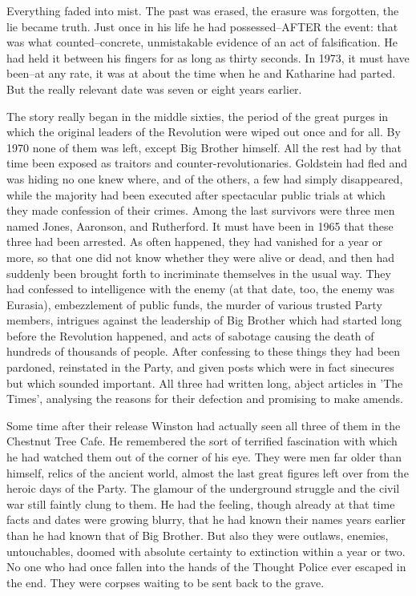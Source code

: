 \documentclass{article}
\begin{document}
Everything faded into mist. The past was erased, the erasure was forgotten,
the lie became truth. Just once in his life he had possessed--AFTER the
event: that was what counted--concrete, unmistakable evidence of an act of
falsification. He had held it between his fingers for as long as thirty
seconds. In 1973, it must have been--at any rate, it was at about the time
when he and Katharine had parted. But the really relevant date was seven
or eight years earlier.

The story really began in the middle sixties, the period of the great
purges in which the original leaders of the Revolution were wiped out
once and for all. By 1970 none of them was left, except Big Brother
himself. All the rest had by that time been exposed as traitors and
counter-revolutionaries. Goldstein had fled and was hiding no one knew
where, and of the others, a few had simply disappeared, while the majority
had been executed after spectacular public trials at which they made
confession of their crimes. Among the last survivors were three men named
Jones, Aaronson, and Rutherford. It must have been in 1965 that these three
had been arrested. As often happened, they had vanished for a year or more,
so that one did not know whether they were alive or dead, and then had
suddenly been brought forth to incriminate themselves in the usual way.
They had confessed to intelligence with the enemy (at that date, too, the
enemy was Eurasia), embezzlement of public funds, the murder of various
trusted Party members, intrigues against the leadership of Big Brother
which had started long before the Revolution happened, and acts of sabotage
causing the death of hundreds of thousands of people. After confessing to
these things they had been pardoned, reinstated in the Party, and given
posts which were in fact sinecures but which sounded important. All three
had written long, abject articles in 'The Times', analysing the reasons
for their defection and promising to make amends.

Some time after their release Winston had actually seen all three of them
in the Chestnut Tree Cafe. He remembered the sort of terrified fascination
with which he had watched them out of the corner of his eye. They were men
far older than himself, relics of the ancient world, almost the last great
figures left over from the heroic days of the Party. The glamour of the
underground struggle and the civil war still faintly clung to them. He had
the feeling, though already at that time facts and dates were growing
blurry, that he had known their names years earlier than he had known that
of Big Brother. But also they were outlaws, enemies, untouchables, doomed
with absolute certainty to extinction within a year or two. No one who had
once fallen into the hands of the Thought Police ever escaped in the end.
They were corpses waiting to be sent back to the grave.
\end{document}
